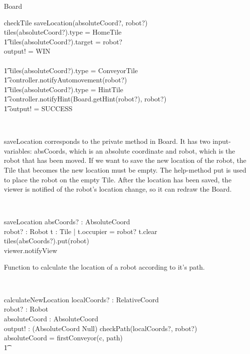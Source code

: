 \documentclass[12pt]{article}
\begin{document}
\begin{class}{Board}
\begin{schema}{checkTile}
\where
saveLocation(absoluteCoord?, robot?) \\
\IF tiles(absoluteCoord?).type = HomeTile \\ \t1
tiles(absoluteCoord?).target = robot? \\
\THEN output! = WIN \\ \
\ELSE  \\ \t1
\IF tiles(absoluteCoord?).type = ConveyorTile \\ \t1
\THEN controller.notifyAutomovement(robot?) \\ \t1
\IF tiles(absoluteCoord?).type = HintTile \\ \t1
\THEN controller.notifyHint(Board.getHint(robot?), robot?) \\ \t1
output! = SUCCESS
\end{schema} \\
\begin{classcom}
saveLocation corresponds to the private method in Board. It has two input-variables: absCoords, which is an absolute coordinate and robot, which is the robot that has been moved.  If we want to save the new location of the robot, the Tile that becomes the new location must be empty. The help-method put is used to place the robot on the empty Tile. After the location has been saved, the viewer is notified of the robot's location change, so it can redraw the Board.
\end{classcom} \\
\begin{schema}{saveLocation}
absCoords? : AbsoluteCoord \\
robot? : Robot
\where
\exists t : Tile | t.occupier = robot? \wedge t.clear\\
tiles(absCoords?).put(robot) \\
viewer.notifyView
\end{schema}
\znewpage
\begin{classcom}
Function to calculate the location of a robot according to it's path.
\end{classcom}\\
\begin{schema}{calculateNewLocation}
localCoords? : RelativeCoord \\
robot? : Robot \\
absoluteCoord : AbsoluteCoord \\
output! : (AbsoluteCoord \union Null)
\where
\IF checkPath(localCoords?, robot?) \\
\THEN absoluteCoord = firstConveyor(c, path) \\ \t1

\end{schema}
\end{class}
\end{document}

